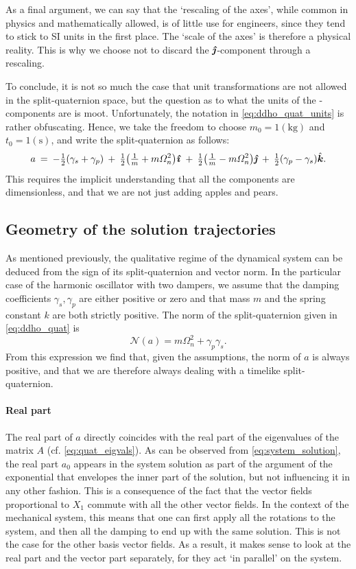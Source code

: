 As a final argument, we can say that the `rescaling of the axes', while common in physics and mathematically allowed, is of little use for engineers, since they tend to stick to SI units in the first place. The `scale of the axes' is therefore a physical reality. This is why we choose not to discard the $\quatj$-component through a rescaling.

To conclude, it is not so much the case that unit transformations are not allowed in the split-quaternion space, but the question as to what the units of the \quatj-components are is moot. Unfortunately, the notation in \cref{eq:ddho_quat_units} is rather obfuscating. Hence, we take the freedom to choose $m_0 = 1 (\si{\kilogram})$ and $t_0 = 1 (\si{\second})$, and write the split-quaternion as follows:
\begin{equation}
    a\:=\: -\tfrac{1}{2}\qty(\gamma_s + \gamma_p)\:+\:\tfrac{1}{2}\qty(\tfrac{1}{m} + m\Omega_n^2)\quati\:+\:\tfrac{1}{2}\qty(\tfrac{1}{m} - m\Omega_n^2)\quatj\:+\:\tfrac{1}{2}\qty(\gamma_p - \gamma_s)\quatk. 
    \label{eq:ddho_quat}
\end{equation}
This requires the implicit understanding that all the components are dimensionless, and that we are not just adding apples and pears. 

\subsection{Geometry of the solution trajectories}
As mentioned previously, the qualitative regime of the dynamical system can be deduced from the sign of its split-quaternion and vector norm. In the particular case of the harmonic oscillator with two dampers, we assume that the damping coefficients $\gamma_s, \gamma_p$ are either positive or zero and that mass $m$ and the spring constant $k$ are both strictly positive. The norm of the split-quaternion given in \cref{eq:ddho_quat} is
$$ \mathscr{N}(a) = m \Omega_n^2 + \gamma_p \gamma_s.$$
From this expression we find that, given the assumptions, the norm of $a$ is always positive, and that we are therefore always dealing with a timelike split-quaternion.

\paragraph{Real part} The real part of $a$ directly coincides with the real part of the eigenvalues of the matrix $A$ (cf. \cref{eq:quat_eigvals}). As can be observed from \cref{eq:system_solution}, the real part $a_0$ appears in the system solution as part of the argument of the exponential that envelopes the inner part of the solution, but not influencing it in any other fashion. This is a consequence of the fact that the vector fields proportional to $X_1$ commute with all the other vector fields. In the context of the mechanical system, this means that one can first apply all the rotations to the system, and then all the damping to end up with the same solution. This is not the case for the other basis vector fields. As a result, it makes sense to look at the real part and the vector part separately, for they act `in parallel' on the system.

